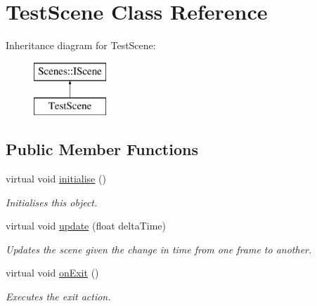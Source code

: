\hypertarget{class_test_scene}{\section{Test\-Scene Class Reference}
\label{class_test_scene}
}
Inheritance diagram for Test\-Scene\-:\begin{figure}[H]
\begin{center}
\leavevmode
\includegraphics[height=2.000000cm]{class_test_scene}
\end{center}
\end{figure}
\subsection*{Public Member Functions}
\begin{DoxyCompactItemize}
\item 
\hypertarget{class_test_scene_af421b86202de66b69b3c21870e1ee990}{virtual void \hyperlink{class_test_scene_af421b86202de66b69b3c21870e1ee990}{initialise} ()}\label{class_test_scene_af421b86202de66b69b3c21870e1ee990}

\begin{DoxyCompactList}\small\item\em Initialises this object. \end{DoxyCompactList}\item 
virtual void \hyperlink{class_test_scene_ad42240fabf5883d481191871cc91c5c3}{update} (float delta\-Time)
\begin{DoxyCompactList}\small\item\em Updates the scene given the change in time from one frame to another. \end{DoxyCompactList}\item 
\hypertarget{class_test_scene_aec5414397def44e25bbc11b9631ec959}{virtual void \hyperlink{class_test_scene_aec5414397def44e25bbc11b9631ec959}{on\-Exit} ()}\label{class_test_scene_aec5414397def44e25bbc11b9631ec959}

\begin{DoxyCompactList}\small\item\em Executes the exit action. \end{DoxyCompactList}\end{DoxyCompactItemize}


